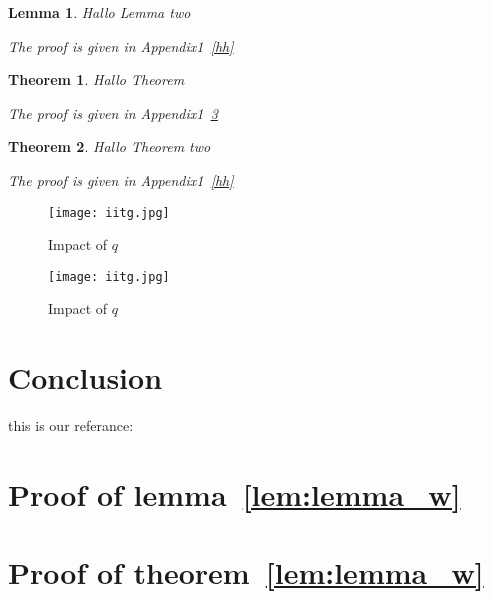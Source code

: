\documentclass[journal]{IEEEtran}
\newtheorem{theorem}{{\bf Theorem}}		%
\newtheorem{lemma}{{\bf Lemma}}
\begin{document}
\begin{lemma}
	Hallo Lemma two
\begin{IEEEproof}
	The proof is given in Appendix1~\ref{hh}
\end{IEEEproof}
\end{lemma}
\begin{theorem}
	Hallo Theorem
\begin{IEEEproof}
	The proof is given in Appendix1~\ref{app:theorem_a}
\end{IEEEproof}
\end{theorem}
\begin{theorem}
	Hallo Theorem two
\begin{IEEEproof}
	The proof is given in Appendix1~\ref{hh}
\end{IEEEproof}
\end{theorem}
\blindtext
\begin{figure*}[!t]
	\centering
	\begin{subfigure}{0.4\textwidth}
		\centering
		\texttt{[image: iitg.jpg]}
		\caption{Impact of $q$}
	\end{subfigure}
\begin{subfigure}{0.4\textwidth}
	\centering
	\texttt{[image: iitg.jpg]}
	\caption{Impact of $q$}
\end{subfigure}
\end{figure*}
\section{Conclusion}
\noindent this is our referance: \cite{fenton2001fault}
\blindtext
\appendices
\section{Proof of lemma~\ref{lem:lemma_w}}
\label{app:lemma_a}
\blindtext
\section{Proof of theorem~\ref{lem:lemma_w}}
\label{app:theorem_a}
\blindtext


\end{document}
